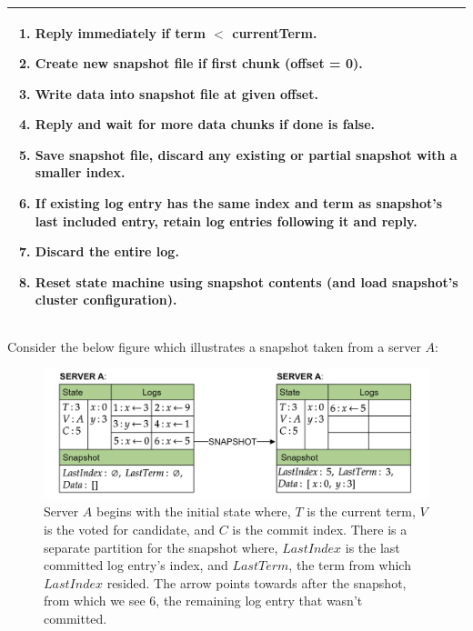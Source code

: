 {\begin{tabular}{|l|p{13.3cm}|}
        \hline
        \multicolumn{2}{|p{10cm}|}{%
            \parbox{11cm}{%
                \begin{enumerate}
                    \item Reply immediately if \textbf{term} $<$ \textbf{currentTerm}.
                    \item Create new snapshot file if first chunk (\textbf{offset} = 0).
                    \item Write data into snapshot file at given \textbf{offset}.
                    \item Reply and wait for more data chunks if \textbf{done} is false.
                    \item Save snapshot file, discard any existing or partial snapshot with a smaller index.
                    \item If existing log entry has the same index and term as snapshot's last included entry, retain log entries following it and reply.
                    \item Discard the entire log.
                    \item Reset state machine using snapshot contents (and load snapshot's cluster configuration).
                \end{enumerate}
            }
        } \\
        \hline
    \end{tabular}
}

\newpage

\noindent
Consider the below figure which illustrates a snapshot taken from a server $A$:
\begin{figure}[ht!]
    \centering
    \includegraphics[width=\textwidth]{Sections/raft/snap.png}

    \vspace{1em}
    \caption{Server $A$ begins with the initial state where, $T$ is the current term, $V$ is the voted for candidate, and $C$ is the commit index. There is a separate partition for the snapshot where,
    $LastIndex$ is the last committed log entry's index, and $LastTerm$, the 
    term from which $LastIndex$ resided. The arrow points towards after the snapshot, from which we see 6, the remaining log entry that wasn't committed.}
\end{figure}


